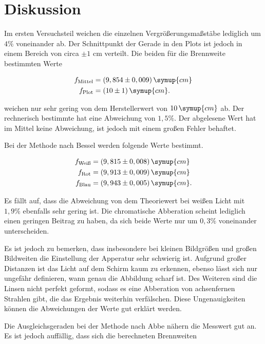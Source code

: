 \section{Diskussion}
\label{sec:Diskussion}

Im ersten Versuchsteil weichen die einzelnen Vergrößerungsmaßstäbe lediglich um $4\%$ voneinander ab.
Der Schnittpunkt der Gerade in den Plots ist jedoch in einem Bereich von circa $\pm 1$ cm verteilt.
Die beiden für die Brennweite bestimmten Werte

\begin{align*}
    f_\text{Mittel} &= (9,854 \pm 0,009) \, \symup{cm}\\
    f_\text{Plot} &= (10 \pm 1) \, \symup{cm}.
\end{align*}

weichen nur sehr gering von dem Herstellerwert von $10 \, \symup{cm}$ ab.
Der rechnerisch bestimmte hat eine Abweichung von $1,5 \%$. Der abgelesene Wert hat im Mittel keine Abweichung, ist jedoch mit einem großen Fehler behaftet.

Bei der Methode nach Bessel werden folgende Werte bestimmt.

\begin{align*}
  f_\text{Weiß} &= (9,815 \pm 0,008) \, \symup{cm}\\
  f_\text{Rot} &=  (9,913 \pm 0,009) \, \symup{cm}\\
  f_\text{Blau} &= (9,943 \pm 0,005) \, \symup{cm}.
\end{align*}

Es fällt auf, dass die Abweichung von dem Theoriewert bei weißen Licht mit $1,9 \%$ ebenfalls sehr gering ist.
Die chromatische Abberation scheint lediglich einen geringen Beitrag zu haben, da sich beide Werte nur um $0,3 \%$ voneinander unterscheiden.

Es ist jedoch zu bemerken, dass insbesondere bei kleinen Bildgrößen und großen Bildweiten die Einstellung der Apperatur sehr schwierig ist.
Aufgrund großer Distanzen ist das Licht auf dem Schirm kaum zu erkennen, ebenso lässt sich nur ungefähr definieren, wann genau die Abbildung scharf ist.
Des Weiteren sind die Linsen nicht perfekt geformt, sodass es eine Abberation von achsenfernen Strahlen gibt, die das Ergebnis weiterhin verfälschen.
Diese Ungenauigkeiten können die Abweichungen der Werte gut erklärt werden.

Die Ausgleichsgeraden bei der Methode nach Abbe nähern die Messwert gut an.
Es ist jedoch auffällig, dass sich die berechneten Brennweiten 

